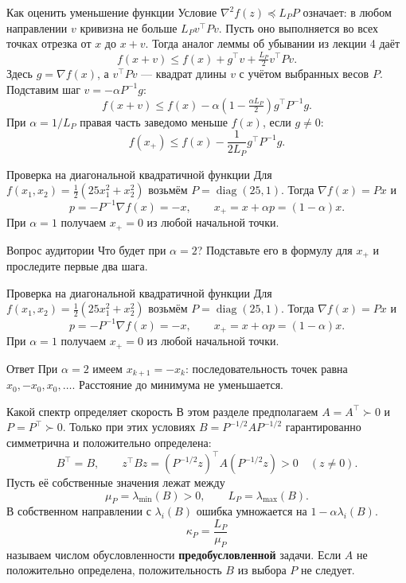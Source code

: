 \documentclass[aspectratio=169,10pt]{beamer}
\newcommand{\grad}{\nabla}
\begin{document}
\begin{frame}{Как оценить уменьшение функции}
\footnotesize
Условие $\nabla^2f(z)\preceq L_PP$ означает:
в любом направлении $v$ кривизна не больше $L_Pv^\top Pv$.
Пусть оно выполняется во всех точках отрезка от $x$ до $x+v$.
Тогда аналог леммы об убывании из лекции 4 даёт
\[
f(x+v)\le f(x)+g^\top v+\tfrac{L_P}{2}v^\top Pv.
\]
Здесь $g=\nabla f(x)$, а $v^\top Pv$ --- квадрат длины $v$ с учётом выбранных весов $P$.
Подставим шаг $v=-\alpha P^{-1}g$:
\[
f(x+v)\le f(x)-\alpha\left(1-\tfrac{\alpha L_P}{2}\right)g^\top P^{-1}g.
\]
При $\alpha=1/L_P$ правая часть заведомо меньше $f(x)$, если $g\ne0$:
\[
\boxed{f(x_+)\le f(x)-\frac{1}{2L_P}g^\top P^{-1}g.}
\]
\end{frame}

\begin{frame}{Проверка на диагональной квадратичной функции}
\small
Для $f(x_1,x_2)=\tfrac12(25x_1^2+x_2^2)$ возьмём $P=\operatorname{diag}(25,1)$.
Тогда $\grad f(x)=Px$ и
\[
p=-P^{-1}\grad f(x)=-x,\qquad x_+=x+\alpha p=(1-\alpha)x.
\]
При $\alpha=1$ получаем $x_+=0$ из любой начальной точки.
\begin{block}{Вопрос аудитории}
Что будет при $\alpha=2$? Подставьте его в формулу для $x_+$ и проследите первые два шага.
\end{block}
\end{frame}

\begin{frame}{Проверка на диагональной квадратичной функции}
\small
Для $f(x_1,x_2)=\tfrac12(25x_1^2+x_2^2)$ возьмём $P=\operatorname{diag}(25,1)$.
Тогда $\grad f(x)=Px$ и
\[
p=-P^{-1}\grad f(x)=-x,\qquad x_+=x+\alpha p=(1-\alpha)x.
\]
При $\alpha=1$ получаем $x_+=0$ из любой начальной точки.
\begin{block}{Ответ}
При $\alpha=2$ имеем $x_{k+1}=-x_k$: последовательность точек равна
$x_0,-x_0,x_0,\ldots$.
Расстояние до минимума не уменьшается.
\end{block}
\end{frame}

\begin{frame}{Какой спектр определяет скорость}
\small
В этом разделе предполагаем $A=A^\top\succ0$ и $P=P^\top\succ0$.
Только при этих условиях $B=P^{-1/2}AP^{-1/2}$ гарантированно симметрична и положительно определена:
\[
B^\top=B,\qquad
z^\top Bz=(P^{-1/2}z)^\top A(P^{-1/2}z)>0\quad(z\ne0).
\]
Пусть её собственные значения лежат между
\[
\mu_P=\lambda_{\min}(B)>0,\qquad L_P=\lambda_{\max}(B).
\]
В собственном направлении с $\lambda_i(B)$ ошибка умножается на $1-\alpha\lambda_i(B)$.
\[
\boxed{\kappa_P=\frac{L_P}{\mu_P}}
\]
называем числом обусловленности \textbf{предобусловленной} задачи.
Если $A$ не положительно определена, положительность $B$ из выбора $P$ не следует.
\end{frame}
\end{document}
